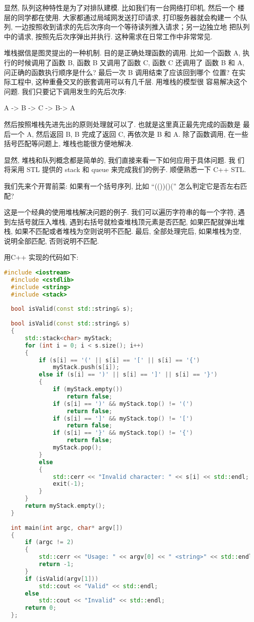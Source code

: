 \documentclass[a4paper]{ctexart}
\theoremstyle{definition}
\theoremstyle{definition}
\begin{document}
显然, 队列这种特性是为了对排队建模. 比如我们有一台网络打印机, 然后一个
楼层的同学都在使用. 大家都通过局域网发送打印请求, 打印服务器就会构建一
个队列, 一边按照收到请求的先后次序向一个等待读列推入请求；另一边独立地
把队列中的请求, 按照先后次序弹出并执行. 这种需求在日常工作中非常常见.

堆栈据信是图灵提出的一种机制. 目的是正确处理函数的调用. 比如一个函数
A, 执行的时候调用了函数 B, 函数 B 又调用了函数 C, 函数 C 还调用了 函数
B 和 A, 问正确的函数执行顺序是什么? 最后一次 B 调用结束了应该回到哪个
位置? 在实际工程中, 这种重叠交叉的嵌套调用可以有几千层. 用堆栈的模型很
容易解决这个问题. 我们只要记下调用发生的先后次序:

\begin{center}
A -> B -> C -> B-> A
\end{center}

然后按照堆栈先进先出的原则处理就可以了. 也就是这里真正最先完成的函数是
最后一个 A, 然后返回 B, B 完成了返回 C, 再依次是 B 和 A. 除了函数调用,
在一些括号匹配等问题上, 堆栈也能很方便地解决.

显然, 堆栈和队列概念都是简单的, 我们直接来看一下如何应用于具体问题. 我
们将采用 STL 提供的 stack 和 queue 来完成我们的例子. 顺便熟悉一下 C++
STL.

我们先来个开胃前菜: 如果有一个括号序列, 比如 ``(())()('' 怎么判定它是否左右匹配? 

这是一个经典的使用堆栈解决问题的例子. 我们可以遍历字符串的每一个字符, 遇到左括号就压入堆栈, 
遇到右括号就检查堆栈顶元素是否匹配, 如果匹配就弹出堆栈, 如果不匹配或者堆栈为空则说明不匹配. 
最后, 全部处理完后, 如果堆栈为空, 说明全部匹配, 否则说明不匹配.

用C++ 实现的代码如下:

\begin{lstlisting}[language=C++]
  #include <iostream>
  #include <cstdlib>
  #include <string>
  #include <stack>
  
  bool isValid(const std::string& s);
  
  bool isValid(const std::string& s) 
  {
      std::stack<char> myStack;
      for (int i = 0; i < s.size(); i++) 
      {
          if (s[i] == '(' || s[i] == '[' || s[i] == '{') 
              myStack.push(s[i]);
          else if (s[i] == ')' || s[i] == ']' || s[i] == '}')
          {
              if (myStack.empty()) 
                  return false;
              if (s[i] == ')' && myStack.top() != '(') 
                  return false;
              if (s[i] == ']' && myStack.top() != '[') 
                  return false;
              if (s[i] == '}' && myStack.top() != '{') 
                  return false;
              myStack.pop();
          }
          else
          {
              std::cerr << "Invalid character: " << s[i] << std::endl;
              exit(-1);
          }
      }
      return myStack.empty();
  }    
  
  int main(int argc, char* argv[])
  {
      if (argc != 2) 
      {
          std::cerr << "Usage: " << argv[0] << " <string>" << std::endl;
          return -1;
      }
      if (isValid(argv[1]))
          std::cout << "Valid" << std::endl;
      else
          std::cout << "Invalid" << std::endl;
      return 0;    
  };   
\end{lstlisting}
\end{document}
